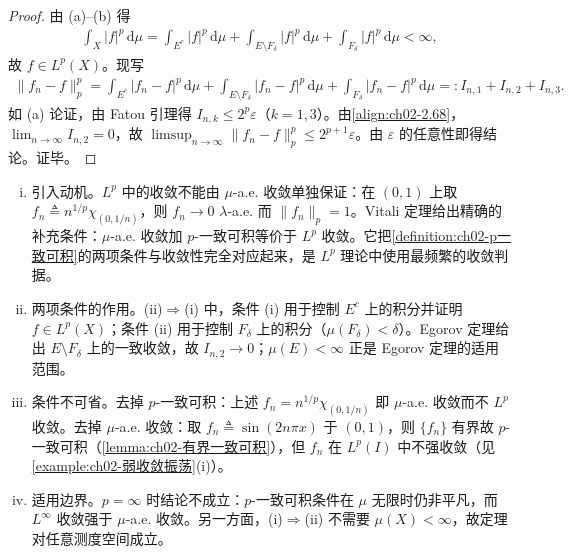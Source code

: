 \documentclass[../../main.tex]{subfiles}%
\begin{document}
\begin{proof}
由 (a)--(b) 得
\begin{align*}
\int_X|f|^p\,\mathrm{d}\mu=\int_{E^c}|f|^p\,\mathrm{d}\mu+\int_{E\setminus F_\delta}|f|^p\,\mathrm{d}\mu+\int_{F_\delta}|f|^p\,\mathrm{d}\mu<\infty,
\end{align*}
故 $f\in L^p(X)$。现写
\begin{align}
\|f_n-f\|_p^p=\int_{E^c}|f_n-f|^p\,\mathrm{d}\mu+\int_{E\setminus F_\delta}|f_n-f|^p\,\mathrm{d}\mu+\int_{F_\delta}|f_n-f|^p\,\mathrm{d}\mu
=:I_{n,1}+I_{n,2}+I_{n,3}. \label{align:ch02-2.69}
\end{align}
如 (a) 论证，由 Fatou 引理得 $I_{n,k}\leqslant 2^p\varepsilon$（$k=1,3$）。由\eqref{align:ch02-2.68}，$\lim_{n\to\infty}I_{n,2}=0$，故 $\limsup_{n\to\infty}\|f_n-f\|_p^p\leqslant 2^{p+1}\varepsilon$。由 $\varepsilon$ 的任意性即得结论。证毕。
\end{proof}

\begin{remark}\label{remark:ch02-Vitali}
\begin{enumerate}[(i)]
\item 引入动机。$L^p$ 中的收敛不能由 $\mu$-a.e. 收敛单独保证：在 $(0,1)$ 上取 $f_n\triangleq n^{1/p}\chi_{(0,1/n)}$，则 $f_n\to0$ $\lambda$-a.e. 而 $\|f_n\|_p=1$。Vitali 定理给出精确的补充条件：$\mu$-a.e. 收敛加 $p$-一致可积等价于 $L^p$ 收敛。它把\cref{definition:ch02-p一致可积}的两项条件与收敛性完全对应起来，是 $L^p$ 理论中使用最频繁的收敛判据。
\item 两项条件的作用。(ii)$\Rightarrow$(i) 中，条件 (i) 用于控制 $E^c$ 上的积分并证明 $f\in L^p(X)$；条件 (ii) 用于控制 $F_\delta$ 上的积分（$\mu(F_\delta)<\delta$）。Egorov 定理给出 $E\setminus F_\delta$ 上的一致收敛，故 $I_{n,2}\to0$；$\mu(E)<\infty$ 正是 Egorov 定理的适用范围。
\item 条件不可省。去掉 $p$-一致可积：上述 $f_n=n^{1/p}\chi_{(0,1/n)}$ 即 $\mu$-a.e. 收敛而不 $L^p$ 收敛。去掉 $\mu$-a.e. 收敛：取 $f_n\triangleq\sin(2n\pi x)$ 于 $(0,1)$，则 $\{f_n\}$ 有界故 $p$-一致可积（\cref{lemma:ch02-有界一致可积}），但 $f_n$ 在 $L^p(I)$ 中不强收敛（见\cref{example:ch02-弱收敛振荡}(i)）。
\item 适用边界。$p=\infty$ 时结论不成立：$p$-一致可积条件在 $\mu$ 无限时仍非平凡，而 $L^\infty$ 收敛强于 $\mu$-a.e. 收敛。另一方面，(i)$\Rightarrow$(ii) 不需要 $\mu(X)<\infty$，故定理对任意测度空间成立。
\end{enumerate}
\end{remark}
\end{document}
